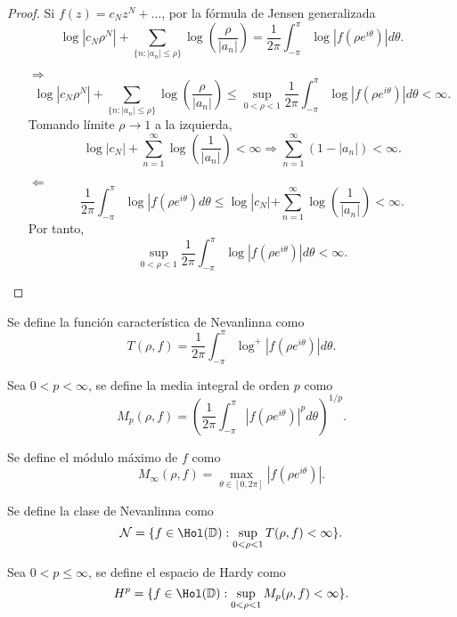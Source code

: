 \begin{proof}
    Si $f(z) = c_Nz^N + \dots$, por la fórmula de Jensen generalizada
    $$\log|c_N\rho^N| + \sum_{\{n : |a_n|\leq\rho\}} \log\left(\frac{\rho}{|a_n|}\right) = \frac{1}{2\pi} \int_{-\pi}^\pi \log|f(\rho e^{i\theta})|d\theta.$$
    \begin{itemize}
        \item[$\boxed{\Rightarrow}$] $$\log|c_N\rho^N| + \sum_{\{n : |a_n|\leq\rho\}} \log\left(\frac{\rho}{|a_n|}\right) \leq \sup_{0<\rho<1} \frac{1}{2\pi} \int_{-\pi}^\pi \log|f(\rho e^{i\theta})|d\theta < \infty.$$
            Tomando límite $\rho \to 1$ a la izquierda,
            $$\log|c_N| + \sum_{n=1}^\infty \log\left(\frac{1}{|a_n|}\right) < \infty \Rightarrow \sum_{n=1}^\infty (1-|a_n|) < \infty.$$
        \item[$\boxed{\Leftarrow}$] $$\frac{1}{2\pi} \int_{-\pi}^\pi \log|f(\rho e^{i\theta})d\theta \leq \log|c_N| + \sum_{n=1}^\infty \log\left(\frac{1}{|a_n|}\right) < \infty.$$
            Por tanto,
            $$\sup_{0<\rho<1} \frac{1}{2\pi} \int_{-\pi}^\pi \log|f(\rho e^{i\theta})|d\theta < \infty.$$
    \end{itemize}
\end{proof}

\begin{definition}
    Se define la función característica de Nevanlinna como
    $$T(\rho, f) = \frac{1}{2\pi} \int_{-\pi}^\pi \log^+|f(\rho e^{i\theta})|d\theta.$$
\end{definition}

\begin{definition}
    Sea $0 < p < \infty$, se define la media integral de orden $p$ como
    $$M_p(\rho, f) = \left(\frac{1}{2\pi} \int_{-\pi}^\pi |f(\rho e^{i\theta})|^pd\theta\right)^{1/p}.$$
\end{definition}

\begin{definition}
    Se define el módulo máximo de $f$ como
    $$M_\infty(\rho, f) = \max_{\theta \in [0, 2\pi]} |f(\rho e^{i\theta})|.$$
\end{definition}

\begin{definition}
    Se define la clase de Nevanlinna como
    $$\mathcal{N} = \{f \in \Hol(\mathbb{D}) : \sup_{0<\rho<1} T(\rho, f) < \infty\}.$$
\end{definition}

\begin{definition}
    Sea $0 < p \leq \infty$, se define el espacio de Hardy como
    $$H^p = \{f \in \Hol(\mathbb{D}) : \sup_{0<\rho<1} M_p(\rho, f) < \infty\}.$$
\end{definition}

